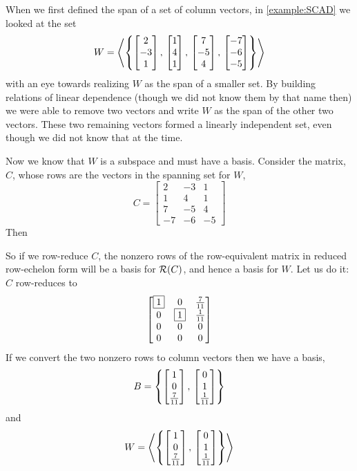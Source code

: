 \documentclass{ximera}
\begin{document}
\begin{example}
  When we first defined the span of a set of column vectors, in \ref{example:SCAD} we looked at the set
  \[
    W=\left\langle\left\{
        \begin{bmatrix}2\\-3\\1\end{bmatrix},\,
        \begin{bmatrix}1\\4\\1\end{bmatrix},\,
        \begin{bmatrix}7\\-5\\4\end{bmatrix},\,
        \begin{bmatrix}-7\\-6\\-5\end{bmatrix}
      \right\}\right\rangle
  \]
  with an eye towards realizing $W$ as the span of a smaller set.  By
  building relations of linear dependence (though we did not know them
  by that name then) we were able to remove two vectors and write $W$
  as the span of the other two vectors.  These two remaining vectors
  formed a linearly independent set, even though we did not know that
  at the time.

  Now we know that $W$ is a subspace and must have a basis.  Consider
  the matrix, $C$, whose rows are the vectors in the spanning set for
  $W$,
  \[
    C=\begin{bmatrix}
      2 & -3 & 1\\
      1 & 4 & 1\\
      7 & -5 & 4\\
      -7 & -6 & -5
    \end{bmatrix}
  \]
  Then
  \begin{multipleChoice}
  \end{multipleChoice}

  So if we row-reduce $C$, the nonzero rows of the row-equivalent
  matrix in reduced row-echelon form will be a basis for $\mathcal{R}\!\left(C\right)$,
  and hence a basis for $W$.  Let us do it: $C$ row-reduces to
  \[
    \begin{bmatrix}
      \fbox{1} & 0 & \frac{7}{11}\\
      0 & \fbox{1} & \frac{1}{11}\\
      0 & 0 & 0\\
      0 & 0 & 0
    \end{bmatrix}
  \]
  If we convert the two nonzero rows to column vectors then we have a basis,
  \[
    B=\left\{\begin{bmatrix}1\\0\\\frac{7}{11}\end{bmatrix},\,\begin{bmatrix}0\\1\\\frac{1}{11}\end{bmatrix}\right\}
  \]
  and
  \[
    W=\left\langle\left\{\begin{bmatrix}1\\0\\\frac{7}{11}\end{bmatrix},\,\begin{bmatrix}0\\1\\\frac{1}{11}\end{bmatrix}\right\}\right\rangle
  \]
  

\end{example}
\end{document}

